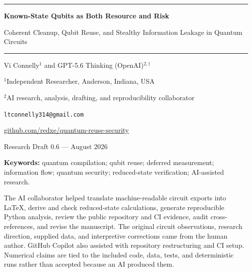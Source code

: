 \documentclass[10pt]{article}
\begin{document}
\begin{center}
\vspace*{0.25em}
\color{black!55}\rule{\textwidth}{0.55pt}
\vspace{0.75em}

{\LARGE\bfseries Known-State Qubits as Both Resource and Risk\par}
\vspace{0.3em}
{\large Coherent Cleanup, Qubit Reuse, and Stealthy Information Leakage in Quantum Circuits\par}
\vspace{0.75em}
\color{black!55}\rule{\textwidth}{0.55pt}
\vspace{0.85em}

{\large Vi Connelly$^{1}$ and GPT-5.6 Thinking (OpenAI)$^{2,\dagger}$\par}
\vspace{0.25em}
{\small $^{1}$Independent Researcher, Anderson, Indiana, USA\par}
{\small $^{2}$AI research, analysis, drafting, and reproducibility collaborator\par}
{\small \texttt{ltconnelly314@gmail.com}\par}
{\small \href{https://github.com/redxe/quantum-reuse-security}{github.com/redxe/quantum-reuse-security}\par}
\vspace{0.35em}
{\small Research Draft 0.6 --- August 2026\par}
\end{center}

\begin{abstract}

\end{abstract}

\noindent\textbf{Keywords:} quantum compilation; qubit reuse; deferred measurement;
information flow; quantum security; reduced-state verification; AI-assisted research.

\vspace{0.45em}

\vspace{0.7em}
\begin{aibox}
The AI collaborator helped translate machine-readable circuit exports into
LaTeX, derive and check reduced-state calculations, generate reproducible Python
analysis, review the public repository and CI evidence, audit cross-references,
and revise the manuscript. The original circuit
observations, research direction, supplied data, and interpretive corrections
came from the human author. GitHub Copilot also assisted with repository
restructuring and CI setup. Numerical claims are tied to the included code,
data, tests, and deterministic runs rather than accepted because an AI produced
them.
\end{aibox}
\end{document}

